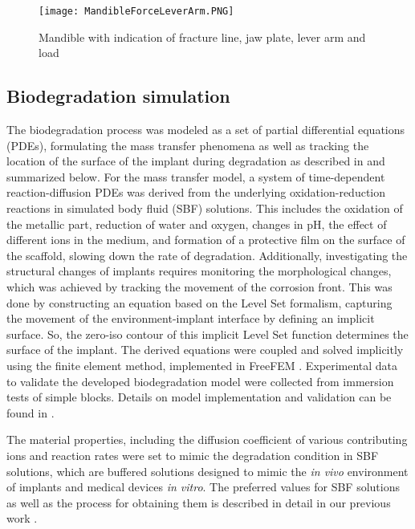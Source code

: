 \begin{figure}[h]
    \centering
    \texttt{[image: MandibleForceLeverArm.PNG]}
    \caption{Mandible with indication of fracture line, jaw plate, lever arm and load}
    \label{fig:MandibleForceLeverArm}
\end{figure}


\subsection{Biodegradation simulation}
\label{sec:biodeg}

The biodegradation process was modeled as a set of partial differential equations (\gls{PDE}s), formulating the mass transfer phenomena as well as tracking the location of the surface of the implant during degradation as described in \cite{Barzegari2021} and summarized below. For the mass transfer model, a system of time-dependent reaction-diffusion PDEs was derived from the underlying oxidation-reduction reactions in simulated body fluid (\gls{SBF}) solutions. This includes the oxidation of the metallic part, reduction of water and oxygen, changes in pH, the effect of different ions in the medium, and formation of a protective film on the surface of the scaffold, slowing down the rate of degradation. Additionally, investigating the structural changes of implants requires monitoring the morphological changes, which was achieved by tracking the movement of the corrosion front. This was done by constructing an equation based on the Level Set formalism, capturing the movement of the environment-implant interface by defining an implicit surface. So, the zero-iso contour of this implicit Level Set function determines the surface of the implant. The derived equations were coupled and solved implicitly using the finite element method, implemented in FreeFEM \cite{Hecht2012}. Experimental data to validate the developed biodegradation model were collected from immersion tests of simple blocks. Details on model implementation and validation can be found in \cite{Barzegari2021}.

The material properties, including the diffusion coefficient of various contributing ions and reaction rates were set to mimic the degradation condition in \gls{SBF} solutions, which are buffered solutions designed to mimic the \textit{in vivo} environment of implants and medical devices \textit{in vitro}. The preferred values for \gls{SBF} solutions as well as the process for obtaining them is described in detail in our previous work \cite{Barzegari2021}. 

